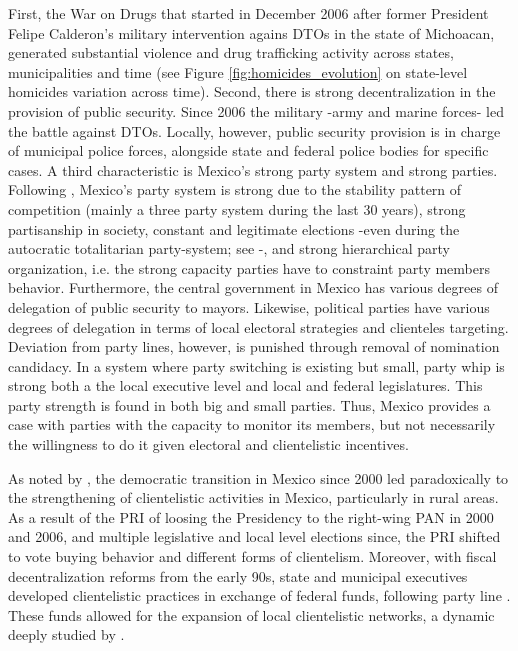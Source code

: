 \documentclass[12pt]{amsart}
\numberwithin{equation}{section}
\theoremstyle{definition}
\theoremstyle{definition}
\theoremstyle{definition}
\begin{document}
\begin{appendix}
First, the War on Drugs that started in December 2006 after former President Felipe Calderon's military intervention agains DTOs in the state of Michoacan, generated substantial violence and drug trafficking activity across states, municipalities and time (see Figure \ref{fig:homicides_evolution} on state-level homicides variation across time). Second, there is strong decentralization in the provision of public security. Since 2006 the military -army and marine forces- led the battle against DTOs. Locally, however, public security provision is in charge of municipal police forces, alongside state and federal police bodies for specific cases. A third characteristic is Mexico's strong party system and strong parties. Following \citet{mainwaring_scully_1995}, Mexico's party system is strong due to the stability pattern of competition (mainly a three party system during the last 30 years), strong partisanship in society, constant and legitimate elections -even during the autocratic totalitarian party-system; see \citet{magaloni_2009}-, and strong hierarchical party organization, i.e. the strong capacity parties have to constraint party members behavior. Furthermore, the central government in Mexico has various degrees of delegation of public security to mayors. Likewise, political parties have various degrees of delegation in terms of local electoral strategies and clienteles targeting. Deviation from party lines, however, is punished through removal of nomination candidacy. In a system where party switching is existing but small, party whip is strong both a the local executive level and local and federal legislatures. This party strength is found in both big and small parties. Thus, Mexico provides a case with parties with the capacity to monitor its members, but not necessarily the willingness to do it given electoral and clientelistic incentives.  

As noted by \citet{schedler_2001}, the democratic transition in Mexico since 2000 led paradoxically to the strengthening of clientelistic activities in Mexico, particularly in rural areas. As a result of the PRI of loosing the Presidency to the right-wing PAN in 2000 and 2006, and multiple legislative and local level elections since, the PRI shifted to vote buying behavior and different forms of clientelism. Moreover, with fiscal decentralization reforms from the early 90s, state and municipal executives developed clientelistic practices in exchange of federal funds, following party line \citep{cornelius_2002}. These funds allowed for the expansion of local clientelistic networks, a dynamic deeply studied by \citet{larreguy_2013}.


\end{appendix}
\end{document}
